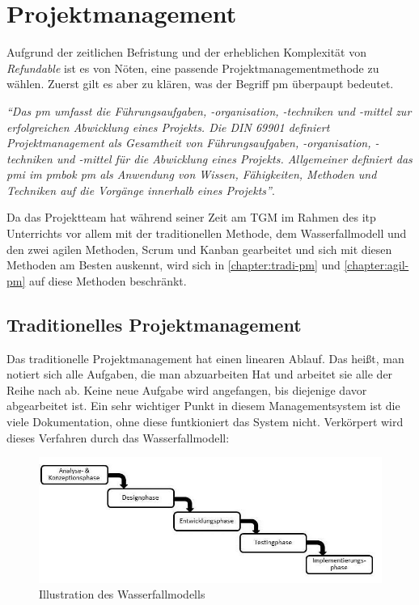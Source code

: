 \chapter{Projektmanagement}
Aufgrund der zeitlichen Befristung und der erheblichen Komplexität von \textit{Refundable} ist es von Nöten, eine passende Projektmanagementmethode zu wählen. Zuerst gilt es aber zu klären, was der Begriff \Gls{pm} überpaupt bedeutet.\\
\begin{center}
	\textit{\enquote{Das \Gls{pm} umfasst die Führungsaufgaben, -organisation, -techniken und -mittel zur erfolgreichen Abwicklung eines Projekts. Die DIN 69901 definiert Projektmanagement als Gesamtheit von Führungsaufgaben, -organisation, -techniken und -mittel für die Abwicklung eines Projekts. Allgemeiner definiert das \Gls{pmi} im \Gls{pmbok} \Gls{pm} als Anwendung von Wissen, Fähigkeiten, Methoden und Techniken auf die Vorgänge innerhalb eines Projekts}}\cite{pm-definition}.
\end{center}
Da das Projektteam hat während seiner Zeit am TGM im Rahmen des \Gls{itp} Unterrichts vor allem mit der traditionellen Methode, dem Wasserfallmodell und den zwei agilen Methoden, Scrum und Kanban gearbeitet und sich mit diesen Methoden am Besten auskennt, wird sich in \autoref{chapter:tradi-pm} und \autoref{chapter:agil-pm} auf diese Methoden beschränkt.
\newpage
\section{Traditionelles Projektmanagement}
\label{chapter:tradi-pm}
Das traditionelle Projektmanagement hat einen linearen Ablauf. Das heißt, man notiert sich alle Aufgaben, die man abzuarbeiten Hat und arbeitet sie alle der Reihe nach ab. Keine neue Aufgabe wird angefangen, bis diejenige davor abgearbeitet ist. Ein sehr wichtiger Punkt in diesem Managementsystem ist die viele Dokumentation, ohne diese funtkioniert das System nicht. Verkörpert wird dieses Verfahren durch das Wasserfallmodell:
\begin{figure}[H]
	\centering
	\includegraphics[width=0.7\linewidth]{images/projektmanagement/wasserfallmodell}
	\caption[Wasserfallmodell]{Illustration des Wasserfallmodells \cite{pm-wasserfall-online}}
	\label{fig:wasserfall}
\end{figure}
